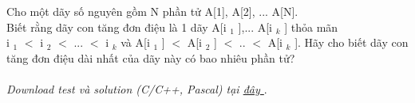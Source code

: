 Cho một dãy số nguyên gồm N phần tử A[1], A[2], ... A[N].   
\\   Biết rằng dãy con tăng đơn điệu là 1 dãy A[i   $_    1   $   ],... A[i   $_    k   $   ] thỏa mãn   
\\   i   $_    1   $   $<$ i   $_    2   $   $<$ ... $<$ i   $_    k   $   và A[i   $_    1   $   ] $<$ A[i   $_    2   $   ] $<$ .. $<$ A[i   $_    k   $   ]. Hãy cho biết dãy con tăng đơn điệu dài nhất của dãy này có bao nhiêu phần tử?   
\\
\\\textit{    Download test và solution (C/C++, Pascal) tại    \href{https://vn.spoj.pl/content/liq.zip}{     đây    }}   .